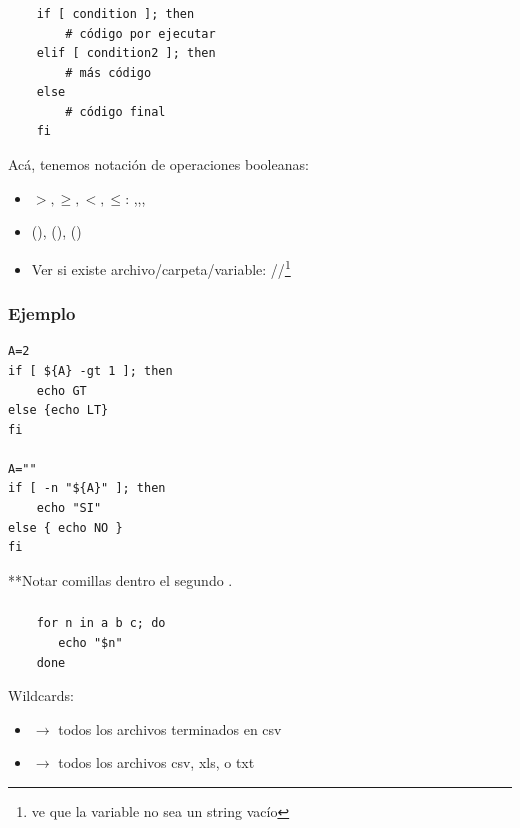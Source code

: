 \documentclass[14pt,aspectratio=169,xcolor=dvipsnames]{beamer}
\begin{document}
\begin{frame}[fragile]\frametitle{}
    \begin{small}
        \begin{verbatim}
    if [ condition ]; then
        # código por ejecutar
    elif [ condition2 ]; then
        # más código
    else
        # código final
    fi
        \end{verbatim}
    Acá, tenemos notación de operaciones booleanas:
        \begin{itemize}
            \item $>,\geq,<,\leq$: ,,,
            \item {} (\code{!}),  (),  ()
            \item Ver si existe archivo/carpeta/variable: //\footnote{ ve que la variable no sea un string vacío}
        \end{itemize}
    \end{small}
\end{frame}
\begin{frame}[fragile]\frametitle{Ejemplo}
    \begin{small}
    \begin{verbatim}
A=2
if [ ${A} -gt 1 ]; then
    echo GT
else {echo LT}
fi

A=""
if [ -n "${A}" ]; then
    echo "SI"
else { echo NO }
fi

    \end{verbatim}    
**Notar comillas dentro el segundo .  \hfill {}
    \end{small}
\end{frame}
\begin{frame}[fragile]\frametitle{}
    \begin{verbatim}
    for n in a b c; do
       echo "$n"
    done
    \end{verbatim}
    Wildcards:
    \begin{itemize}
        \item {} $\to$ todos los archivos terminados en csv
        \item {} $\to$ todos los archivos csv, xls, o txt
    \end{itemize}

\end{frame}
\end{document}
